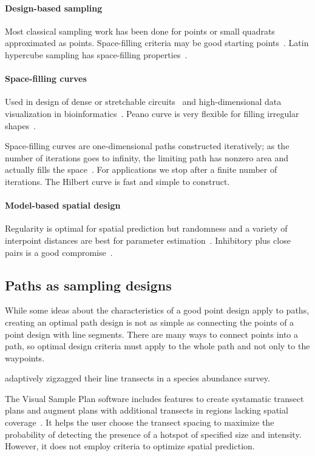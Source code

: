 \documentclass[review]{elsarticle}
\begin{document}
\paragraph{Design-based sampling}
Most classical sampling work has been done for points or small quadrats
approximated as points. Space-filling criteria may be good starting
points~\citep{borkowskipiepel}. Latin hypercube sampling has space-filling
properties~\cite{mckayetal,husslageetal}.

\paragraph{Space-filling curves}
Used in design of dense or stretchable circuits~\citep{ogorzalek,mazhang} and
high-dimensional data visualization in bioinformatics~\citep{hilbertvis}. Peano
curve is very flexible for filling irregular shapes~\citep{fanetal}.

Space-filling curves are one-dimensional paths constructed iteratively; as the
number of iterations goes to infinity, the limiting path has nonzero area and
actually fills the space~\citep{sagan}. For applications we stop after a finite
number of iterations. The Hilbert curve is fast and simple to construct.

\paragraph{Model-based spatial design}
Regularity is optimal for spatial prediction but randomness and a variety of
interpoint distances are best for parameter estimation~\citep{diggle}.
Inhibitory plus close pairs is a good compromise~\citep{chipetaetal2017}.


\subsection{Paths as sampling designs}

While some ideas about the characteristics of a good point design apply to
paths, creating an optimal path design is not as simple as connecting the
points of a point design with line segments. There are many ways to connect
points into a path, so optimal design criteria must apply to the whole path and
not only to the waypoints.

\citet{pollard} adaptively zigzagged their line transects in a species
abundance survey.

The Visual Sample Plan software includes features to create systamatic transect
plans and augment plans with additional transects in regions lacking spatial
coverage~\citep{vspguide}. It helps the user choose the transect spacing to
maximize the probability of detecting the presence of a hotspot of specified
size and intensity. However, it does not employ criteria to optimize spatial
prediction.
\end{document}
